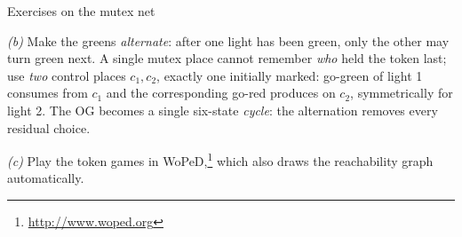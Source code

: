 \begin{examplebox}{Exercises on the mutex net}
\begin{center}
\end{center}
\par\smallskip
\emph{(b)} Make the greens \emph{alternate}: after one light has been green, only the other may turn green next. A single mutex place cannot remember \emph{who} held the token last; use \emph{two} control places $c_1, c_2$, exactly one initially marked: \textsf{go-green} of light 1 consumes from $c_1$ and the corresponding \textsf{go-red} produces on $c_2$, symmetrically for light 2.
The OG becomes a single six-state \emph{cycle}: the alternation removes every residual choice.
\par\smallskip
\emph{(c)} Play the token games in WoPeD,\footnote{\url{http://www.woped.org}} which also draws the reachability graph automatically.
\end{examplebox}

